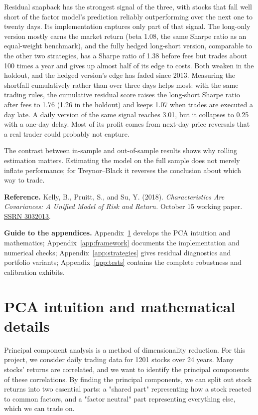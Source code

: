 \documentclass[11pt,letterpaper]{article}
\begin{document}
Residual snapback has the strongest signal of the three, with stocks that fall well short of the factor model's prediction reliably outperforming over the next one to twenty days. Its implementation captures only part of that signal. The long-only version mostly earns the market return (beta 1.08, the same Sharpe ratio as an equal-weight benchmark), and the fully hedged long-short version, comparable to the other two strategies, has a Sharpe ratio of 1.38 before fees but trades about 100 times a year and gives up almost half of its edge to costs. Both weaken in the holdout, and the hedged version's edge has faded since 2013. Measuring the shortfall cumulatively rather than over three days helps most: with the same trading rules, the cumulative residual score raises the long-short Sharpe ratio after fees to 1.76 (1.26 in the holdout) and keeps 1.07 when trades are executed a day late. A daily version of the same signal reaches 3.01, but it collapses to 0.25 with a one-day delay. Most of its profit comes from next-day price reversals that a real trader could probably not capture. 

The contrast between in-sample and out-of-sample results shows why rolling estimation matters. Estimating the model on the full sample does not merely inflate performance; for Treynor--Black it reverses the conclusion about which way to trade.

\begingroup\small
\noindent\textbf{Reference.}
Kelly, B., Pruitt, S., and Su, Y. (2018).
\emph{Characteristics Are Covariances: A Unified Model of Risk and Return.}
October 15 working paper. \href{https://ssrn.com/abstract=3032013}{SSRN 3032013}.
\par\endgroup


\clearpage
\appendix
{}
\noindent\textbf{Guide to the appendices.}
Appendix~\ref{app:primer} develops the PCA intuition and mathematics;
Appendix~\ref{app:framework} documents the implementation and numerical checks;
Appendix~\ref{app:strategies} gives residual diagnostics and portfolio variants;
Appendix~\ref{app:tests} contains the complete robustness and calibration exhibits.
\par\medskip


\section{PCA intuition and mathematical details}
\label{app:primer}
Principal component analysis is a method of dimensionality reduction. For this project, we consider daily trading data for 1201 stocks over 24 years. Many stocks' returns are correlated, and we want to identify the principal components of these correlations. By finding the principal components, we can split out stock returns into two essential parts: a "shared part" representing how a stock reacted to common factors, and a "factor neutral" part representing everything else, which we can trade on. 
\end{document}
